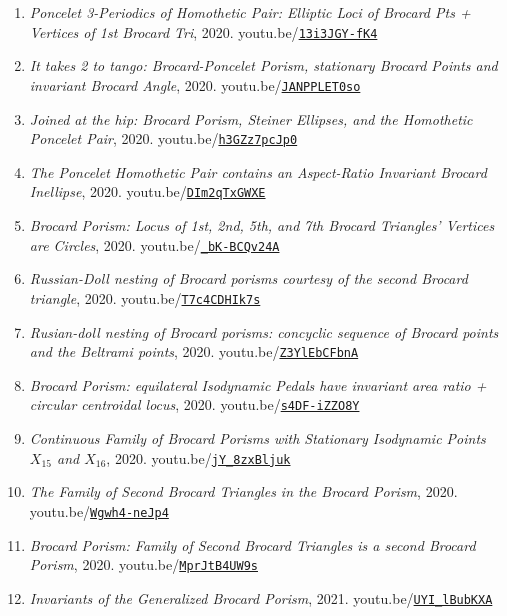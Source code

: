 \documentclass[12pt]{article}
\begin{document}
\begin{enumerate}[resume]
\item \textit{Poncelet 3-Periodics of Homothetic Pair: Elliptic Loci of Brocard Pts + Vertices of 1st Brocard Tri}, 2020. youtu.be/\href{https://youtu.be/13i3JGY-fK4}{\nolinkurl{13i3JGY-fK4}}
\item \textit{It takes 2 to tango: Brocard-Poncelet Porism, stationary Brocard Points and invariant Brocard Angle}, 2020. youtu.be/\href{https://youtu.be/JANPPLET0so}{\nolinkurl{JANPPLET0so}}
\item \textit{Joined at the hip: Brocard Porism, Steiner Ellipses, and the Homothetic Poncelet Pair}, 2020. youtu.be/\href{https://youtu.be/h3GZz7pcJp0}{\nolinkurl{h3GZz7pcJp0}}
\item \textit{The Poncelet Homothetic Pair contains an Aspect-Ratio Invariant Brocard Inellipse}, 2020. youtu.be/\href{https://youtu.be/DIm2qTxGWXE}{\nolinkurl{DIm2qTxGWXE}}
\item \textit{Brocard Porism: Locus of 1st, 2nd, 5th, and 7th Brocard Triangles' Vertices are Circles}, 2020. youtu.be/\href{https://youtu.be/_bK-BCQv24A}{\nolinkurl{\_bK-BCQv24A}}
\item \textit{Russian-Doll nesting of Brocard porisms courtesy of the second Brocard triangle}, 2020. youtu.be/\href{https://youtu.be/T7c4CDHIk7s}{\nolinkurl{T7c4CDHIk7s}}
\item \textit{Rusian-doll nesting of Brocard porisms: concyclic sequence of Brocard points and the Beltrami points}, 2020. youtu.be/\href{https://youtu.be/Z3YlEbCFbnA}{\nolinkurl{Z3YlEbCFbnA}}
\item \textit{Brocard Porism: equilateral Isodynamic Pedals have invariant area ratio + circular centroidal locus}, 2020. youtu.be/\href{https://youtu.be/s4DF-iZZO8Y}{\nolinkurl{s4DF-iZZO8Y}}
\item \textit{Continuous Family of Brocard Porisms with Stationary Isodynamic Points $X_{15}$ and $X_{16}$}, 2020. youtu.be/\href{https://youtu.be/jY_8zxBljuk}{\nolinkurl{jY\_8zxBljuk}}
\item \textit{The Family of Second Brocard Triangles in the Brocard Porism}, 2020. youtu.be/\href{https://youtu.be/Wgwh4-neJp4}{\nolinkurl{Wgwh4-neJp4}}
\item \textit{Brocard Porism: Family of Second Brocard Triangles is a second Brocard Porism}, 2020. youtu.be/\href{https://youtu.be/MprJtB4UW9s}{\nolinkurl{MprJtB4UW9s}}
\item \textit{Invariants of the Generalized Brocard Porism}, 2021. youtu.be/\href{https://youtu.be/UYI_lBubKXA}{\nolinkurl{UYI\_lBubKXA}}
\end{enumerate}
\end{document}
